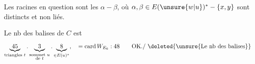 Les racines en question sont les $\alpha-\beta$, où $\alpha,\beta\in E(\unsure{w|u})^*-\{x,y\}$ sont distincts et non liés.

Le nb des balises de $C$ est
\[
\underbrace{45}_{\text{triangles }t}.\underbrace{3}_{\substack{\text{sommet }u\\\text{de }t}}.\underbrace{8}_{\in E(u)^*},\quad=\operatorname{card}W_{E_6}:48\qquad\text{OK.}/\ \deleted{\text{\unsure{Le nb des balises}}}
\]

